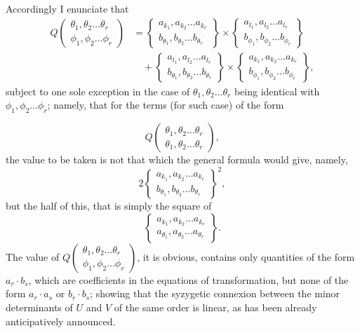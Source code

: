 \documentclass[11pt]{article}
\newcommand{\sourcepage}[1]{\marginpar{\scriptsize p.~#1}}
\newcommand{\bd}[2]{\left\{\begin{matrix}#1\\#2\end{matrix}\right\}}
\begin{document}
{{\[\]
Accordingly I enunciate that
\[
\begin{aligned}
Q\left(\begin{matrix}\theta_1,\theta_2\ldots\theta_r\\ \phi_1,\phi_2\ldots\phi_r\end{matrix}\right)
&=\bd{a_{k_1},a_{k_2}\ldots a_{k_r}}{b_{\theta_1},b_{\theta_2}\ldots b_{\theta_r}}
\times
\bd{a_{l_1},a_{l_2}\ldots a_{l_r}}{b_{\phi_1},b_{\phi_2}\ldots b_{\phi_r}}\\
&\quad+
\bd{a_{l_1},a_{l_2}\ldots a_{l_r}}{b_{\theta_1},b_{\theta_2}\ldots b_{\theta_r}}
\times
\bd{a_{k_1},a_{k_2}\ldots a_{k_r}}{b_{\phi_1},b_{\phi_2}\ldots b_{\phi_r}},
\end{aligned}\tag{2}
\]
subject to one sole exception in the case of $\theta_1,\theta_2\ldots\theta_r$ being identical with $\phi_1,\phi_2\ldots\phi_r$; namely, that for the terms (for such case) of the form

\sourcepage{245}
\[
Q\left(\begin{matrix}\theta_1,\theta_2\ldots\theta_r\\ \theta_1,\theta_2\ldots\theta_r\end{matrix}\right),
\]
the value to be taken is not that which the general formula would give, namely,
\[
2\bd{a_{k_1},a_{k_2}\ldots a_{k_r}}{b_{\theta_1},b_{\theta_2}\ldots b_{\theta_r}}^2,
\]
but the half of this, that is simply the square of
\[
\bd{a_{k_1},a_{k_2}\ldots a_{k_r}}{a_{\theta_1},a_{\theta_2}\ldots a_{\theta_r}}.
\]
The value of $Q\left(\begin{smallmatrix}\theta_1,\theta_2\ldots\theta_r\\ \phi_1,\phi_2\ldots\phi_r\end{smallmatrix}\right)$, it is obvious, contains only quantities of the form $a_r\cdot b_s$, which are coefficients in the equations of transformation, but none of the form $a_r\cdot a_s$ or $b_r\cdot b_s$; showing that the syzygetic connexion between the minor determinants of $U$ and $V$ of the same order is linear, as has been already anticipatively announced.

}}
\end{document}
